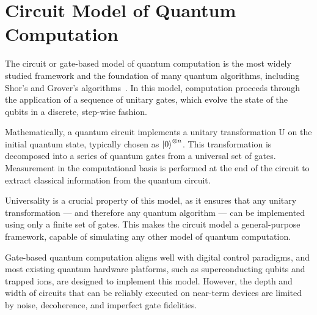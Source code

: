 \section{Circuit Model of Quantum Computation}
\label{Section:GateModelQC}

The circuit or gate-based model of quantum computation is the most widely studied framework and the foundation of many quantum algorithms, including Shor's and Grover's algorithms~\cite{nielsen00}. In this model, computation proceeds through the application of a sequence of unitary gates, which evolve the state of the qubits in a discrete, step-wise fashion.

Mathematically, a quantum circuit implements a unitary transformation U on the initial quantum state, typically chosen as $\ket{0}^{\otimes n}$. This transformation is decomposed into a series of quantum gates from a universal set of gates. Measurement in the computational basis is performed at the end of the circuit to extract classical information from the quantum circuit.

Universality is a crucial property of this model, as it ensures that any unitary transformation --- and therefore any quantum algorithm --- can be implemented using only a finite set of gates. This makes the circuit model a general-purpose framework, capable of simulating any other model of quantum computation.

Gate-based quantum computation aligns well with digital control paradigms, and most existing quantum hardware platforms, such as superconducting qubits and trapped ions, are designed to implement this model. However, the depth and width of circuits that can be reliably executed on near-term devices are limited by noise, decoherence, and imperfect gate fidelities.